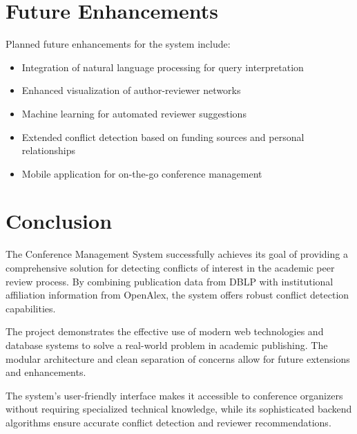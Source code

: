 \documentclass[12pt,a4paper]{article}
\begin{document}
\section{Future Enhancements}
Planned future enhancements for the system include:
\begin{itemize}
    \item Integration of natural language processing for query interpretation
    \item Enhanced visualization of author-reviewer networks
    \item Machine learning for automated reviewer suggestions
    \item Extended conflict detection based on funding sources and personal relationships
    \item Mobile application for on-the-go conference management
\end{itemize}

\section{Conclusion}
The Conference Management System successfully achieves its goal of providing a comprehensive solution for detecting conflicts of interest in the academic peer review process. By combining publication data from DBLP with institutional affiliation information from OpenAlex, the system offers robust conflict detection capabilities.

The project demonstrates the effective use of modern web technologies and database systems to solve a real-world problem in academic publishing. The modular architecture and clean separation of concerns allow for future extensions and enhancements.

The system's user-friendly interface makes it accessible to conference organizers without requiring specialized technical knowledge, while its sophisticated backend algorithms ensure accurate conflict detection and reviewer recommendations.

\newpage

\end{document}

